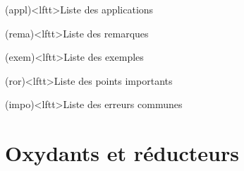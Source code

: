 \documentclass[../../main/main.tex]{subfiles}
\begin{document}
\begin{boxes}
	\begin{tcb}(appl)<lftt>{Liste des applications}
	\end{tcb}
	\begin{tcb}(rema)<lftt>{Liste des remarques}
	\end{tcb}
	\begin{tcb}(exem)<lftt>{Liste des exemples}
	\end{tcb}
	\begin{tcb}(ror)<lftt>{Liste des points importants}
	\end{tcb}
	\begin{tcb}(impo)<lftt>{Liste des erreurs communes}
	\end{tcb}
\end{boxes}
\vspace*{\fill}
\newpage

\section{Oxydants et réducteurs}
\end{document}
